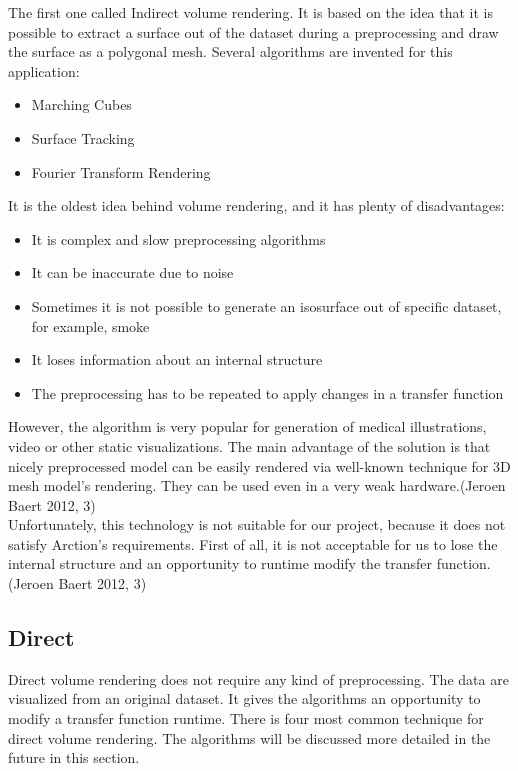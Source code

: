 \documentclass[twoside, english, 11pt]{report}
\begin{document}
The first one called Indirect volume rendering. It is based on the idea that it is possible to extract a surface out of the dataset during a preprocessing and draw the surface as a polygonal mesh. Several algorithms are invented for this application:
\begin{itemize}
\item Marching Cubes
\item Surface Tracking
\item Fourier Transform Rendering
\end{itemize}
It is the oldest idea behind volume rendering, and it has plenty of disadvantages:
\begin{itemize}
\item It is complex and slow preprocessing algorithms
\item It can be inaccurate due to noise
\item Sometimes it is not possible to generate an isosurface out of specific dataset, for example, smoke
\item It loses information about an internal structure
\item The preprocessing has to be repeated to apply changes in a transfer function 
\end{itemize}

However, the algorithm is very popular for generation of medical illustrations, video or other static visualizations. The main advantage of the solution is that nicely preprocessed model can be easily rendered via well-known technique for 3D mesh model's rendering. They can be used even in a very weak hardware.(Jeroen Baert 2012, 3)\\

Unfortunately, this technology is not suitable for our project, because it does not satisfy Arction's requirements. First of all, it is not acceptable for us to lose the internal structure and an opportunity to runtime modify the transfer function.(Jeroen Baert 2012, 3)

\subsection{Direct}
Direct volume rendering does not require any kind of preprocessing. The data are visualized from an original dataset. It gives the algorithms an opportunity to modify a transfer function runtime. There is four most common technique for direct volume rendering. The algorithms will be discussed more detailed in the future in this section.\\
\end{document}
